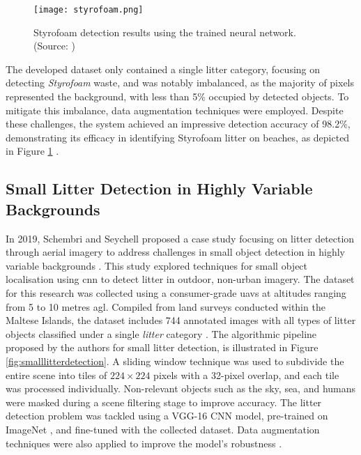\begin{figure}[!htbp]
    \centering
    \texttt{[image: styrofoam.png]}
    \caption{Styrofoam detection results using the trained neural network. (Source: \cite{styrofoam})}
    \label{fig:styrofoam}
\end{figure}

The developed dataset only contained a single litter category, focusing on detecting \textit{Styrofoam} waste, and was notably imbalanced, as the majority of pixels represented the background, with less than 5\% occupied by detected objects. To mitigate this imbalance, data augmentation techniques were employed. Despite these challenges, the system achieved an impressive detection accuracy of 98.2\%, demonstrating its efficacy in identifying Styrofoam litter on beaches, as depicted in Figure \ref{fig:styrofoam} \cite{styrofoam}.

\subsection{Small Litter Detection in Highly Variable Backgrounds}
\label{subsec:3_smalldetection}

In 2019, Schembri and Seychell proposed a case study focusing on litter detection through aerial imagery to address challenges in small object detection in highly variable backgrounds \cite{small_litter_detection}. This study explored techniques for small object localisation using \gls{cnn} to detect litter in outdoor, non-urban imagery. The dataset for this research was collected using a consumer-grade \gls{uav}s at altitudes ranging from 5 to 10 metres \gls{agl}. Compiled from land surveys conducted within the Maltese Islands, the dataset includes 744 annotated images with all types of litter objects classified under a single \textit{litter} category \cite{small_litter_detection}.
The algorithmic pipeline proposed by the authors for small litter detection, is illustrated in Figure \ref{fig:smalllitterdetection}. A sliding window technique was used to subdivide the entire scene into tiles of $224 \times 224$ pixels with a 32-pixel overlap, and each tile was processed individually. Non-relevant objects such as the sky, sea, and humans were masked during a scene filtering stage to improve accuracy. The litter detection problem was tackled using a VGG-16 CNN model, pre-trained on ImageNet \cite{image_net}, and fine-tuned with the collected dataset. Data augmentation techniques were also applied to improve the model’s robustness \cite{small_litter_detection}.

